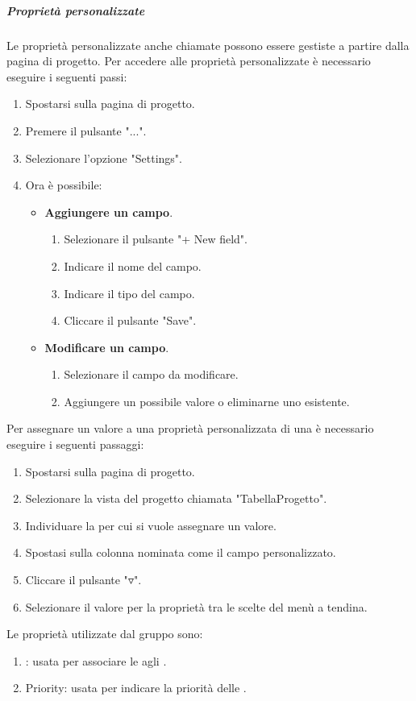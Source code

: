 \subparagraph{Proprietà personalizzate}
\label{subpar:proprietà_personalizzate}
Le proprietà personalizzate anche chiamate  possono essere gestiste a partire dalla pagina di progetto.
Per accedere alle proprietà personalizzate è necessario eseguire i seguenti passi:
\begin{enumerate}
    \item Spostarsi sulla pagina di progetto.
    \item Premere il pulsante "...".
    \item Selezionare l'opzione "Settings".
    \item Ora è possibile:
    \begin{itemize}
        \item \textbf{Aggiungere un campo}.
        \begin{enumerate}
            \item Selezionare il pulsante "+ New field".
            \item Indicare il nome del campo.
            \item Indicare il tipo del campo.
            \item Cliccare il pulsante "Save".
        \end{enumerate}

        \item \textbf{Modificare un campo}.
        \begin{enumerate}
            \item  Selezionare il campo da modificare.
            \item Aggiungere un possibile valore o eliminarne uno esistente.
        \end{enumerate}
    \end{itemize}
\end{enumerate}
Per assegnare un valore a una proprietà personalizzata di una  è necessario eseguire i seguenti passaggi:
\begin{enumerate}
    \item Spostarsi sulla pagina di progetto.
    \item Selezionare la vista del progetto chiamata "TabellaProgetto".
    \item Individuare la  per cui si vuole assegnare un valore.
    \item Spostasi sulla colonna nominata come il campo personalizzato.
    \item Cliccare il pulsante "$\triangledown$".
    \item Selezionare il valore per la proprietà tra le scelte del menù a tendina.
\end{enumerate}
Le proprietà utilizzate dal gruppo sono:
\begin{enumerate}
    \item {}: usata per associare le  agli .
    \item Priority: usata per indicare la priorità delle .
\end{enumerate}

